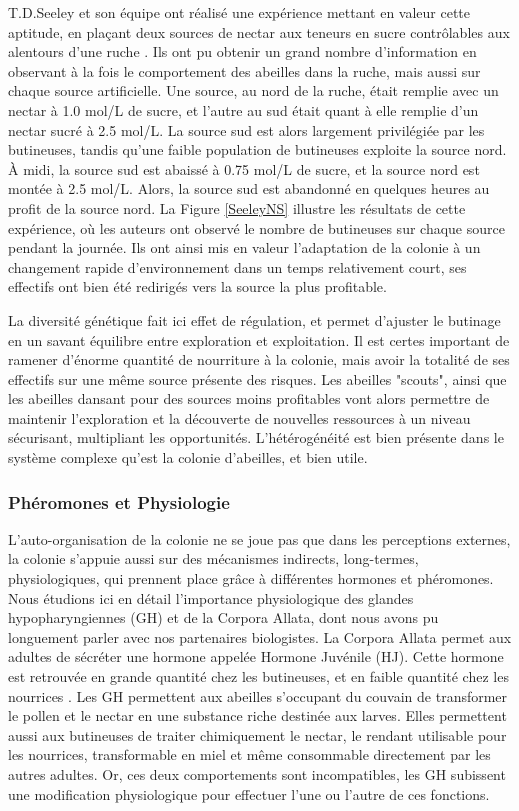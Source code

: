 			 T.D.Seeley et son équipe ont réalisé une expérience mettant en valeur cette aptitude, en plaçant deux sources de nectar aux teneurs en sucre contrôlables aux alentours d'une ruche \cite{seeley_collective_1991}. Ils ont pu obtenir un grand nombre d'information en observant à la fois le comportement des abeilles dans la ruche, mais aussi sur chaque source artificielle. Une source, au nord de la ruche, était remplie avec un nectar à 1.0 mol/L de sucre, et l'autre au sud était quant à elle remplie d'un nectar sucré à 2.5 mol/L. 
			La source sud est alors largement privilégiée par les butineuses, tandis qu'une faible population de butineuses exploite la source nord. À midi, la source sud est abaissé à 0.75 mol/L de sucre, et la source nord est montée à 2.5 mol/L. Alors, la source sud est abandonné en quelques heures au profit de la source nord. La Figure \ref{SeeleyNS} illustre les résultats de cette expérience, où les auteurs ont observé le nombre de butineuses sur chaque source pendant la journée. Ils ont ainsi mis en valeur l'adaptation de la colonie à un changement rapide d'environnement dans un temps relativement court, ses effectifs ont bien été redirigés vers la source la plus profitable.
			
			La diversité génétique fait ici effet de régulation, et permet d'ajuster le butinage en un savant équilibre entre exploration et exploitation. Il est certes important de ramener d'énorme quantité de nourriture à la colonie, mais avoir la totalité de ses effectifs sur une même source présente des risques. Les abeilles "scouts", ainsi que les abeilles dansant pour des sources moins profitables vont alors permettre de maintenir l'exploration et la découverte de nouvelles ressources à un niveau sécurisant, multipliant les opportunités. L'hétérogénéité est bien présente dans le système complexe qu'est la colonie d'abeilles, et bien utile.
			
		\subsubsection{Phéromones et Physiologie}
			\label{subsubPhysio}
			L'auto-organisation de la colonie ne se joue pas que dans les perceptions externes, la colonie s'appuie aussi sur des mécanismes indirects, long-termes, physiologiques, qui prennent place grâce à différentes hormones et phéromones.  Nous étudions ici en détail l'importance physiologique des glandes hypopharyngiennes (GH) et de la Corpora Allata, dont nous avons pu longuement parler avec nos partenaires biologistes. La Corpora Allata permet aux adultes de sécréter une hormone appelée Hormone Juvénile (HJ). Cette hormone est retrouvée en grande quantité chez les butineuses, et en faible quantité chez les nourrices \cite{le_conte_primer_2001}. Les GH permettent aux abeilles s'occupant du couvain de transformer le pollen et le nectar en une substance riche destinée aux larves. Elles permettent aussi aux butineuses de traiter chimiquement le nectar, le rendant utilisable pour les nourrices, transformable en miel et même consommable directement par les autres adultes. Or, ces deux comportements sont incompatibles, les GH subissent une modification physiologique pour effectuer l'une ou l'autre de ces fonctions. 
			
